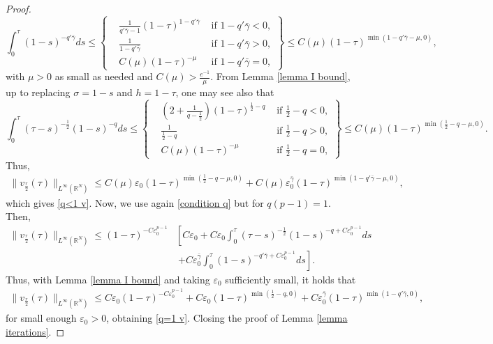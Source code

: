 \documentclass[11pt,a4paper]{article}
\newcommand{\1}{\mathbbm{1}}
\numberwithin{equation}{section}
\newcommand{\numberset}{\mathbb}
\newcommand{\R}{\numberset{R}}
\theoremstyle{remark}
\begin{document}
\begin{proof}
\begin{equation}
 \int^\tau_0(1-s)^{-q'\bar \gamma}ds\leq \left\{
 \begin{split}
     &\frac{1}{q'\bar \gamma-1}(1-\tau)^{1-q'\bar \gamma} &\text{ if } 1-q'\bar \gamma<0,\\
     & \frac{1}{1-q'\bar \gamma}&\text{ if } 1-q'\bar \gamma>0,\\
     &C(\mu)(1-\tau)^{-\mu}&\text{ if } 1-q'\bar \gamma=0,
 \end{split}
\right\}\leq C(\mu)(1-\tau)^{\min(1-q'\bar \gamma-\mu,0)},
\end{equation}
with $\mu>0$ as small as needed and $C(\mu)>\frac{e^{-1}}{\mu}$. From Lemma \ref{lemma I bound}, up to replacing $\sigma=1-s$ and $h=1-\tau$, one may see also that
\begin{equation}
 \int^\tau_0 (\tau-s)^{-\frac{1}{2}}(1-s)^{-q}ds\leq \left\{
 \begin{split}
     &\left(2+\frac{1}{q-\frac{1}{2}}\right)(1-\tau)^{\frac{1}{2}-q} &\text{ if } \frac{1}{2}-q<0,\\
     & \frac{1}{\frac{1}{2}-q}&\text{ if } \frac{1}{2}-q>0,\\
     &C(\mu)(1-\tau)^{-\mu}&\text{ if } \frac{1}{2}-q=0,
 \end{split}
\right\}\leq C(\mu)(1-\tau)^{\min(\frac{1}{2}-q-\mu,0)}.
\end{equation}
Thus,
\begin{equation*}
\begin{split}
\| v_{\frac{r}{2}}(\tau)\|_{L^\infty(\R^N)}\leq C(\mu)\varepsilon_0 (1-\tau)^{\min(\frac{1}{2}-q-\mu,0)}+C(\mu)\varepsilon_0^{\bar \gamma}(1-\tau)^{\min(1-q'\bar \gamma-\mu,0)},
\end{split}
\end{equation*}
which gives \eqref{q<1 v}. Now, we use again \eqref{condition q} but for $q(p-1)=1$. Then,
\begin{equation*}
\begin{split}
\| v_{\frac{r}{2}}(\tau)\|_{L^\infty(\R^N)}\leq (1-\tau)^{-C\varepsilon_0^{p-1}}&\left[C\varepsilon_0+C\varepsilon_0\int^\tau_0 (\tau-s)^{-\frac{1}{2}}(1-s)^{-q+C\varepsilon_0^{p-1}}ds\right.\\
&\ \left.+C\varepsilon_0^{\bar \gamma}\int^\tau_0(1-s)^{-q'\bar \gamma+C\varepsilon_0^{p-1}}ds\right].
\end{split}
\end{equation*}
Thus, with Lemma \ref{lemma I bound} and taking $\varepsilon_0$ sufficiently small, it holds that
\begin{equation*}
\begin{split}
\| v_{\frac{r}{2}}(\tau)\|_{L^\infty(\R^N)}\leq C\varepsilon_0(1-\tau)^{-C\varepsilon_0^{p-1}}+C\varepsilon_0 (1-\tau)^{\min(\frac{1}{2}-q,0)}+C\varepsilon_0^{\bar \gamma}(1-\tau)^{\min(1-q'\bar \gamma,0)},
\end{split}
\end{equation*}
for small enough $\varepsilon_0>0$, obtaining \eqref{q=1 v}. Closing the proof of Lemma \ref{lemma iterations}.
\end{proof}
\end{document}
